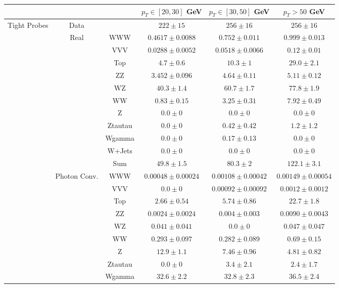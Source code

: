 \small
\begin{tabular}{|c|cc||c|c|c|}
\hline
\multicolumn{3}{|c||}{} & $p_{T}\in[20,30]$ GeV & $p_{T}\in[30,50]$ GeV & $p_{T} > 50$ GeV\\ 
\hline
\hline
\multirow{23}{*}{Tight Probes} & Data & &  $222 \pm 15$ &  $256 \pm 16$ &  $256 \pm 16$\\ 
\cline{2-6}
&\multirow{11}{*}{Real} &WWW &  $0.4617 \pm 0.0088$ &  $0.752 \pm 0.011$ &  $0.999 \pm 0.013$\\ 
&& VVV &  $0.0288 \pm 0.0052$ &  $0.0518 \pm 0.0066$ &  $0.12 \pm 0.01$\\ 
&& Top &  $4.7 \pm 0.6$ &  $10.3 \pm 1$ &  $29.0 \pm 2.1$\\ 
&& ZZ &  $3.452 \pm 0.096$ &  $4.64 \pm 0.11$ &  $5.11 \pm 0.12$\\ 
&& WZ &  $40.3 \pm 1.4$ &  $60.7 \pm 1.7$ &  $77.8 \pm 1.9$\\ 
&& WW &  $0.83 \pm 0.15$ &  $3.25 \pm 0.31$ &  $7.92 \pm 0.49$\\ 
&& Z &  $0.0 \pm 0$ &  $0.0 \pm 0$ &  $0.0 \pm 0$\\ 
&& Ztautau &  $0.0 \pm 0$ &  $0.42 \pm 0.42$ &  $1.2 \pm 1.2$\\ 
&& Wgamma &  $0.0 \pm 0$ &  $0.17 \pm 0.13$ &  $0.0 \pm 0$\\ 
&& W+Jets &  $0.0 \pm 0$ &  $0.0 \pm 0$ &  $0.0 \pm 0$\\ 
\cline{3-6}
&& Sum &  $49.8 \pm 1.5$ &  $80.3 \pm 2$ &  $122.1 \pm 3.1$\\ 
\cline{2-6}
\cline{2-6}
&\multirow{11}{*}{Photon Conv.}& WWW &  $0.00048 \pm 0.00024$ &  $0.00108 \pm 0.00042$ &  $0.00149 \pm 0.00054$\\ 
&& VVV &  $0.0 \pm 0$ &  $0.00092 \pm 0.00092$ &  $0.0012 \pm 0.0012$\\ 
&& Top &  $2.66 \pm 0.54$ &  $5.74 \pm 0.86$ &  $22.7 \pm 1.8$\\ 
&& ZZ &  $0.0024 \pm 0.0024$ &  $0.004 \pm 0.003$ &  $0.0090 \pm 0.0043$\\ 
&& WZ &  $0.041 \pm 0.041$ &  $0.0 \pm 0$ &  $0.047 \pm 0.047$\\ 
&& WW &  $0.293 \pm 0.097$ &  $0.282 \pm 0.089$ &  $0.69 \pm 0.15$\\ 
&& Z &  $12.9 \pm 1.1$ &  $7.46 \pm 0.96$ &  $4.81 \pm 0.82$\\ 
&& Ztautau &  $0.0 \pm 0$ &  $3.4 \pm 2.1$ &  $2.4 \pm 1.7$\\ 
&& Wgamma &  $32.6 \pm 2.2$ &  $32.8 \pm 2.3$ &  $36.5 \pm 2.4$\\ 

\end{tabular}
